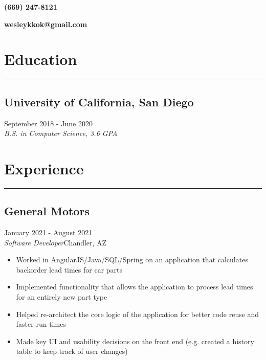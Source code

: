 \documentclass{article}
\makeatletter
\renewcommand{\maketitle}
{
\vspace{-1em}
{\hfill\large\bf (669) 247-8121}

\vspace{-2em}
{\noindent\fontsize{40pt}{0pt}\selectfont\bf\color{DarkMidnightBlue} \theauthor} 

\vspace{-1.5em}
{\hfill\large\bf wesleykkok@gmail.com}

}
\makeatother
\begin{document}
\author{Wesley Kok}
\maketitle 					%
\thispagestyle{empty} 		%
\large 						%
\setlength\parindent{0pt}	%

\vspace{-0.5em}
\section{Education}
\vspace{-1.5em}
\par\noindent\rule{\textwidth}{0.4pt}

\vspace{-0.5em}
\subsection{University of California, San Diego}\hfill {\color{NavyBlue}September 2018 - June 2020\\ 
{\color{Black}\it B.S. in Computer Science, 3.6 GPA}}

\vspace{-0.5em}
\section{Experience}
\vspace{-1.5em}
\par\noindent\rule{\textwidth}{0.4pt}

\vspace{-0.5em}
\subsection{General Motors}\hfill {\color{NavyBlue}January 2021 - August 2021\\ {\color{Black}\it Software Developer}\hfill Chandler, AZ}%
\begin{itemize}
\itemsep0em 
	\item Worked in AngularJS/Java/SQL/Spring on an application that calculates backorder lead times for car parts
	\item Implemented functionality that allows the application to process lead times for an entirely new part type
	\item Helped re-architect the core logic of the application for better code reuse and faster run times
	\item Made key UI and usability decisions on the front end (e.g. created a history table to keep track of user changes)
\end{itemize}
\end{document}
